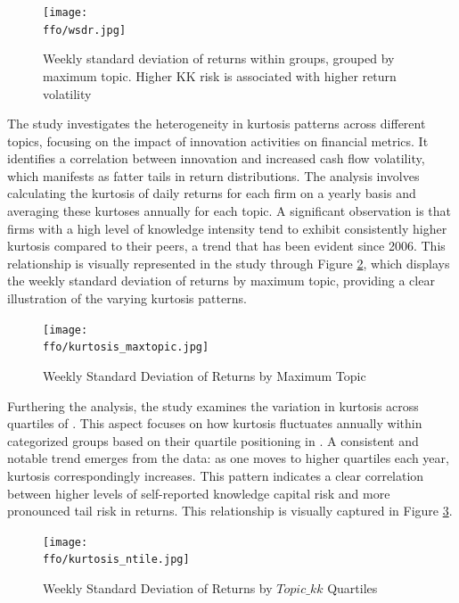 \documentclass[12pt, letterpaper]{article}
\begin{document}
\begin{figure}[h!]
			\centering
			\texttt{[image: \\ffo/wsdr.jpg]}
			\label{fig:wsdr}
			\caption{Weekly standard deviation of returns within groups, grouped by maximum topic. Higher KK risk is associated with higher return volatility}
\end{figure}


The study investigates the heterogeneity in kurtosis patterns across different topics, focusing on the impact of innovation activities on financial metrics. It identifies a correlation between innovation and increased cash flow volatility, which manifests as fatter tails in return distributions. The analysis involves calculating the kurtosis of daily returns for each firm on a yearly basis and averaging these kurtoses annually for each topic. A significant observation is that firms with a high level of knowledge intensity tend to exhibit consistently higher kurtosis compared to their peers, a trend that has been evident since 2006. This relationship is visually represented in the study through Figure \ref{fig:kurtosis_maxtopic}, which displays the weekly standard deviation of returns by maximum topic, providing a clear illustration of the varying kurtosis patterns.

\begin{figure}[h!]
\centering
\texttt{[image: \\ffo/kurtosis\_maxtopic.jpg]}
\caption{Weekly Standard Deviation of Returns by Maximum Topic}
\label{fig:kurtosis_maxtopic}
\end{figure}

Furthering the analysis, the study examines the variation in kurtosis across quartiles of \tkk. This aspect focuses on how kurtosis fluctuates annually within categorized groups based on their quartile positioning in \tkk. A consistent and notable trend emerges from the data: as one moves to higher quartiles each year, kurtosis correspondingly increases. This pattern indicates a clear correlation between higher levels of self-reported knowledge capital risk and more pronounced tail risk in returns. This relationship is visually captured in Figure \ref{fig:kurtosis_ntile}.

\begin{figure}[h!]
\centering
\texttt{[image: \\ffo/kurtosis\_ntile.jpg]}
\caption{Weekly Standard Deviation of Returns by $Topic\_{kk}$ Quartiles}
\label{fig:kurtosis_ntile}
\end{figure}
\end{document}
